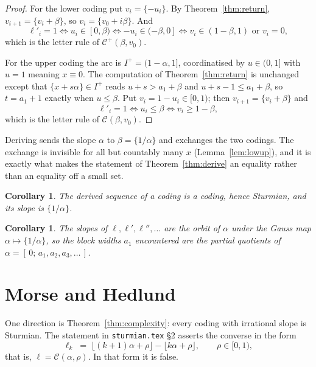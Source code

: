 \documentclass[11pt,a4paper]{article}
\newcommand{\C}{\mathcal{C}}
\newcommand{\Cp}{\mathcal{C}^{+}}
\theoremstyle{definition}
\theoremstyle{plain}
\newtheorem{corollary}[definition]{Corollary}
\begin{document}
\begin{proof}
For the lower coding put $v_i = \{-u_i\}$. By Theorem~\ref{thm:return},
$v_{i+1} = \{v_i + \beta\}$, so $v_i = \{v_0 + i\beta\}$. And
\[
  \ell'_i = 1 \iff u_i \in [0,\beta)
  \iff -u_i \in (-\beta, 0]
  \iff v_i \in (1-\beta,1) \text{ or } v_i = 0 ,
\]
which is the letter rule of $\Cp(\beta, v_0)$.

For the upper coding the arc is $I^+ = (1-\alpha,1]$, coordinatised by
$u \in (0,1]$ with $u = 1$ meaning $x \equiv 0$. The computation of
Theorem~\ref{thm:return} is unchanged except that $\{x+s\alpha\} \in I^+$ reads
$u + s > a_1 + \beta$ and $u + s - 1 \leq a_1 + \beta$, so
$t = a_1 + 1$ exactly when $u \leq \beta$. Put $v_i = 1 - u_i \in [0,1)$; then
$v_{i+1} = \{v_i + \beta\}$ and
\[
  \ell'_i = 1 \iff u_i \leq \beta \iff v_i \geq 1 - \beta ,
\]
which is the letter rule of $\C(\beta, v_0)$.
\end{proof}

Deriving sends the slope $\alpha$ to $\beta = \{1/\alpha\}$ and exchanges the
two codings. The exchange is invisible for all but countably many $x$
(Lemma~\ref{lem:lowup}), and it is exactly what makes the statement of
Theorem~\ref{thm:derive} an equality rather than an equality off a small set.

\begin{corollary}\label{cor:derivesturmian}
The derived sequence of a coding is a coding, hence Sturmian, and its slope is
$\{1/\alpha\}$.
\end{corollary}

\begin{corollary}\label{cor:gauss}
The slopes of $\ell, \ell', \ell'', \ldots$ are the orbit of $\alpha$ under the
Gauss map $\alpha \mapsto \{1/\alpha\}$, so the block widths $a_1$ encountered
are the partial quotients of $\alpha = [\,0;\, a_1, a_2, a_3, \ldots\,]$.
\end{corollary}

\section{Morse and Hedlund}

One direction is Theorem~\ref{thm:complexity}: every coding with irrational
slope is Sturmian. The statement in \texttt{sturmian.tex} \S2 asserts the
converse in the form
\[
  \ell_k \;=\; \lfloor (k+1)\alpha + \rho\rfloor - \lfloor k\alpha + \rho\rfloor,
  \qquad \rho \in [0,1) ,
\]
that is, $\ell = \C(\alpha,\rho)$. In that form it is false.
\end{document}
